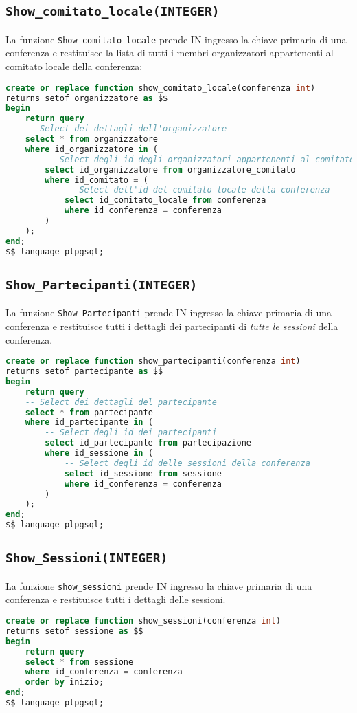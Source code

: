 \subsection{\texttt{Show\_comitato\_locale(INTEGER)}}
La funzione \texttt{Show\_comitato\_locale} prende IN ingresso la chiave primaria di una conferenza e restituisce la lista di tutti i membri organizzatori appartenenti al comitato locale della conferenza:
\begin{lstlisting}[language=SQL, style=mystyle]
create or replace function show_comitato_locale(conferenza int)
returns setof organizzatore as $$
begin
    return query
    -- Select dei dettagli dell'organizzatore
    select * from organizzatore
    where id_organizzatore in (
        -- Select degli id degli organizzatori appartenenti al comitato locale
        select id_organizzatore from organizzatore_comitato
        where id_comitato = (
            -- Select dell'id del comitato locale della conferenza
            select id_comitato_locale from conferenza
            where id_conferenza = conferenza
        )
    );
end;
$$ language plpgsql;
\end{lstlisting}
\subsection{\texttt{Show\_Partecipanti(INTEGER)}}
La funzione \texttt{Show\_Partecipanti} prende IN ingresso la chiave primaria di una conferenza e restituisce tutti i dettagli dei partecipanti di \textit{tutte le sessioni} della conferenza.
\begin{lstlisting}[language=SQL,style=mystyle]
create or replace function show_partecipanti(conferenza int)
returns setof partecipante as $$
begin
    return query
    -- Select dei dettagli del partecipante
    select * from partecipante
    where id_partecipante in (
        -- Select degli id dei partecipanti
        select id_partecipante from partecipazione
        where id_sessione in (
            -- Select degli id delle sessioni della conferenza
            select id_sessione from sessione
            where id_conferenza = conferenza
        )
    );
end;
$$ language plpgsql;
\end{lstlisting}
\subsection{\texttt{Show\_Sessioni(INTEGER)}}
La funzione \texttt{show\_sessioni} prende IN ingresso la chiave primaria di una conferenza e restituisce tutti i dettagli delle sessioni.
\begin{lstlisting}[language=SQL, style=mystyle]
create or replace function show_sessioni(conferenza int)
returns setof sessione as $$
begin
    return query
    select * from sessione
    where id_conferenza = conferenza
    order by inizio;
end;
$$ language plpgsql;
\end{lstlisting}
